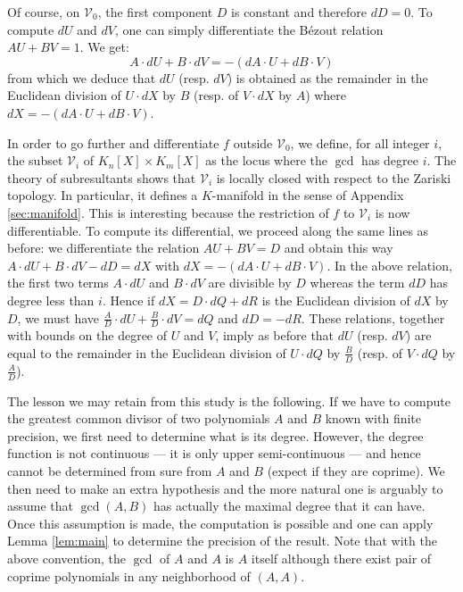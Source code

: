 \documentclass{lms}
\begin{document}
Of course, on $\mathcal V_0$, the first component $D$ is constant and 
therefore $dD = 0$. To compute $dU$ and $dV$, one can simply 
differentiate the B\'ezout relation $AU + BV = 1$. We get:
$$A \cdot dU + B \cdot dV = - (dA \cdot U + dB \cdot V)$$
from which we deduce that $dU$ (resp. $dV$) is obtained as the 
remainder in the Euclidean division of $U{\cdot}dX$ by $B$ (resp. of 
$V{\cdot}dX$ by $A$) where $dX = - (dA \cdot U + dB \cdot V)$.

In order to go further and differentiate $f$ outside $\mathcal V_0$, we 
define, for all integer $i$, the subset $\mathcal V_i$ of $K_n[X] \times 
K_m[X]$ as the locus where the $\gcd$ has degree $i$. The theory of 
subresultants shows that $\mathcal V_i$ is locally closed with respect to 
the Zariski topology. In particular, it defines a $K$-manifold in the 
sense of Appendix \ref{sec:manifold}. This is interesting because the 
restriction of $f$ to $\mathcal V_i$ is now differentiable. To compute
its differential, we proceed along the same lines as before: we 
differentiate the relation $AU + BV = D$ and obtain this way
$A \cdot dU + B \cdot dV - dD = dX$
with $dX = - (dA \cdot U + dB \cdot V)$. In the above relation, the
first two terms $A{\cdot}dU$ and $B{\cdot}dV$ are divisible by $D$ 
whereas the term $dD$ has degree less than $i$. 
Hence if $dX = D \cdot dQ + dR$ is the Euclidean division of $dX$ by $D$, 
we must have $\frac A D \cdot dU + \frac B D \cdot dV = dQ$ and $dD = 
-dR$. These relations, together with bounds on the degree of $U$ and $V$,
imply as before that $dU$ (resp. $dV$) are equal to the remainder in the
Euclidean division of $U{\cdot}dQ$ by $\frac B D$ (resp. of $V{\cdot}dQ$
by $\frac A D$).

\medskip

The lesson we may retain from this study is the following. If we have to 
compute the greatest common divisor of two polynomials $A$ and $B$ known 
with finite precision, we first need to determine what is its degree. 
However, the degree function is not continuous --- it is only upper 
semi-continuous --- and hence cannot be determined from sure from $A$ and 
$B$ (expect if they are coprime). We then need to make an extra 
hypothesis and the more natural one is arguably to assume that 
$\gcd(A,B)$ has actually the maximal degree that it can have. Once this
assumption is made, the computation is possible and one can apply Lemma 
\ref{lem:main} to determine the precision of the result.
Note that with the above convention, the $\gcd$ of $A$ and $A$ is $A$ 
itself although there exist pair of coprime polynomials in any 
neighborhood of $(A,A)$.
\end{document}
